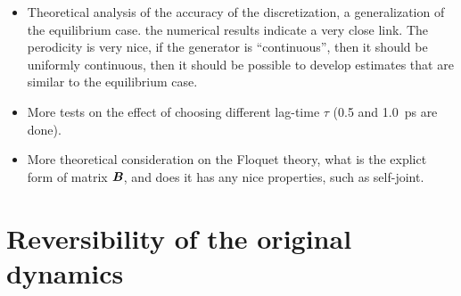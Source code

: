 \documentclass[aip,jcp,preprint,unsortedaddress,a4paper,onecolumn]{revtex4-1}
\newcommand{\vect}[1]{\textbf{\textit{#1}}}
\begin{document}
\begin{itemize}
\item Theoretical analysis of the accuracy of the discretization, a
generalization of the equilibrium case. the numerical results indicate
a very close link. The perodicity is very nice, if the generator is
``continuous'', then it should be uniformly continuous, then it should
be possible to develop estimates that are similar to the equilibrium
case.
\item More tests on the effect of choosing different lag-time $\tau$ (0.5 and 1.0~ps are done).
\item More theoretical consideration on the Floquet theory, what is the
explict form of matrix $\vect B$, and does it has any nice properties,
such as self-joint.
\end{itemize}


\section{Reversibility of the original dynamics}
\end{document}
